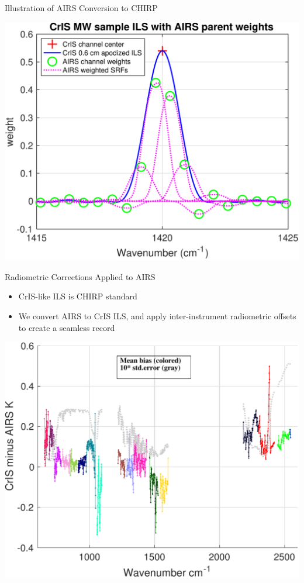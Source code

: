 \documentclass[10pt,t]{beamer}
\begin{document}
\begin{frame}[label={sec:orgb64c756}]{Illustration of AIRS Conversion to CHIRP}
\begin{center}
\includegraphics[width=0.85\linewidth]{./sample_CrIS_ILS_with_AIRS_parent_SRFs.pdf}
\end{center}
\end{frame}
\begin{frame}[label={sec:orgda0af89}]{Radiometric Corrections Applied to AIRS}
\vspace{-0.1in}
\begin{itemize}
\item CrIS-like ILS is CHIRP standard
\item We convert AIRS to CrIS ILS, and apply inter-instrument radiometric offsets to create a seamless record
\end{itemize}
\begin{center}
\includegraphics[width=0.7\linewidth]{./ac_sno_2018_bias_stderr_coloraslp.pdf}
\end{center}
\end{frame}
\end{document}
